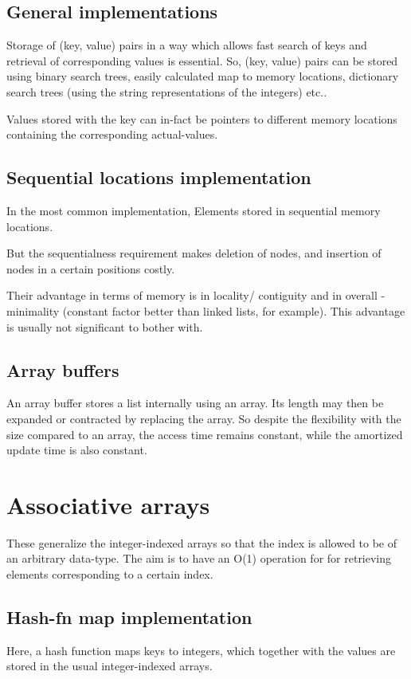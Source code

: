 \documentclass[oneside, article]{memoir}
\begin{document}
\subsection{General implementations}
Storage of (key, value) pairs in a way which allows fast search of keys and retrieval of corresponding values is essential. So, (key, value) pairs can be stored using binary search trees, easily calculated map to memory locations, dictionary search trees (using the string representations of the integers) etc..

Values stored with the key can in-fact be pointers to different memory locations containing the corresponding actual-values.

\subsection{Sequential locations implementation}
In the most common implementation, Elements stored in sequential memory locations.

But the sequentialness requirement makes deletion of nodes, and insertion of nodes in a certain positions costly.

Their advantage in terms of memory is in locality/ contiguity and in overall - minimality (constant factor better than linked lists, for example). This advantage is usually not significant to bother with.

\subsection{Array buffers}
An array buffer stores a list internally using an array. Its length may then be expanded or contracted by replacing the array. So despite the flexibility with the size compared to an array, the access time remains constant, while the amortized update time is also constant.

\section{Associative arrays}
These generalize the integer-indexed arrays so that the index is allowed to be of an arbitrary data-type. The aim is to have an O(1) operation for for retrieving elements corresponding to a certain index.

\subsection{Hash-fn map implementation}
Here, a hash function maps keys to integers, which together with the values are stored in the usual integer-indexed arrays.
\end{document}
